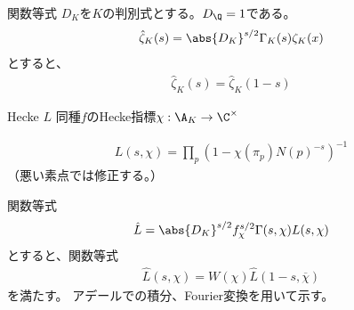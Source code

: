 \documentclass[dvipdfmx]{beamer}
\begin{document}
\begin{frame}{関数等式}
  $D_K$を$K$の判別式とする。$D_\Q=1$である。
  \begin{align*}
    \hat{\zeta}_K(s)=\abs{D_K}^{s/2}\Gamma_K(s)\zeta_K(x)
  \end{align*}
  とすると、
  \begin{align*}
    \hat{\zeta}_K(s)=\hat{\zeta}_K(1-s)
  \end{align*}
\end{frame}

\begin{frame}{Hecke $L$}
  同種$f$のHecke指標$\chi:\A_K \to \C^\times$

  \begin{align*}
    L(s,\chi)=\prod_p(1-\chi(\pi_p)N(p)^{-s})^{-1}
  \end{align*}
  （悪い素点では修正する。）

\end{frame}

\begin{frame}{関数等式}    
  \begin{align*}
    \hat{L}=\abs{D_K}^{s/2}f_\chi^{s/2}\Gamma(s,\chi)L(s,\chi)
  \end{align*}
  とすると、関数等式
  \begin{align*}
    \hat{L}(s,\chi)=W(\chi)\hat{L}(1-s,\overline{\chi})
  \end{align*}
  を満たす。  アデールでの積分、Fourier変換を用いて示す。
\end{frame}

\begin{comment}
  
\begin{frame}{Artin $L$}
  Galois表現$\sigma:\Gal(L/K) \to GL_n(\C)$に対し
  \begin{align*}
    L(s,\sigma)=\prod_p\det(1-N(p)^{-s}\sigma(\Frob_p))
  \end{align*}
  （悪い素点では修正する。）

  $\sigma=1$の時が$K$のDedekind $\zeta$ $L(s,1)=\zeta_K(s)$である。
  $n=1$のときDirichlet $L$（$K=\Q$なら円分体$\Gal(\Q(\zeta_m)/\Q)\cong(\Z/m\Z^\times$、類体論）
\end{frame}

\begin{frame}{関数等式}
  未解決？
\end{frame}

\end{comment}
\end{document}

